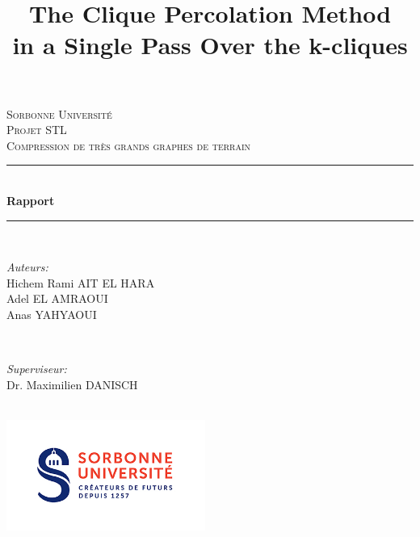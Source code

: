\documentclass[a4paper,12pt]{article}
\title{The Clique Percolation Method\\in a Single Pass Over the k-cliques}
\author{}
\date{}
\begin{document}
\begin{titlepage}

\newcommand{\HRule}{\rule{\linewidth}{0.5mm}} 

\center %

\textsc{\LARGE Sorbonne Université}\\[1.5cm] 
\textsc{\Large Projet STL}\\[0.5cm] 
\textsc{\large Compression de très grands graphes de terrain}\\[0.5cm] 

\HRule \\[0.4cm]
{ \huge \bfseries Rapport}\\[0.4cm] %
\HRule \\[1.5cm]

\begin{minipage}{0.4\textwidth}
\begin{flushleft} \large
\emph{Auteurs:}\\
Hichem Rami \textsc{AIT EL HARA}
\\Adel \textsc{EL AMRAOUI}
\\Anas \textsc{YAHYAOUI} 

\end{flushleft}
\end{minipage}
~
\begin{minipage}{0.4\textwidth}
\begin{flushright} \large
\emph{Superviseur:} \\
Dr. Maximilien \textsc{DANISCH} %
\end{flushright}
\end{minipage}\\[2cm]

\includegraphics[width=65mm,scale=1]{Contents/logoSU.jpg} %
 

\vfill %

\end{titlepage}
\end{document}
